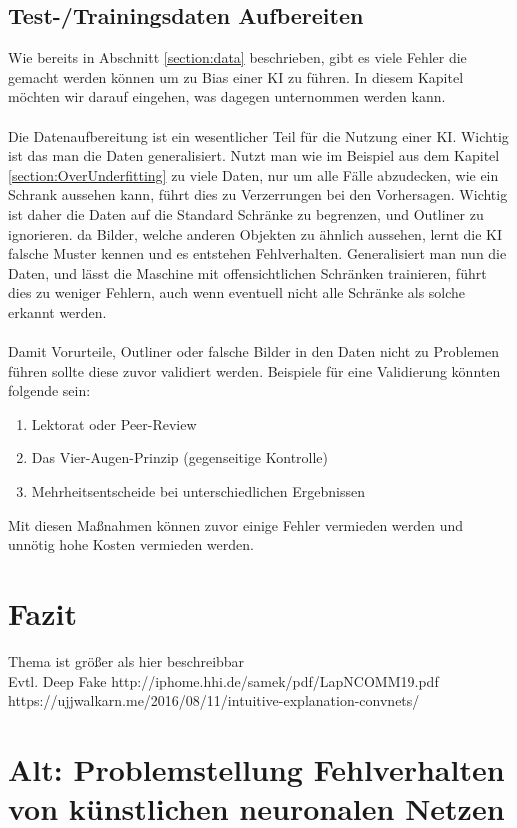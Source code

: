 \documentclass[12pt,oneside,a4paper,parskip]{scrbook}
\begin{document}
\section{Test-/Trainingsdaten Aufbereiten}
\label{section:preventData}
Wie bereits in Abschnitt \ref{section:data} beschrieben, gibt es viele Fehler die gemacht werden können um zu Bias einer KI zu führen. In diesem Kapitel möchten wir darauf eingehen, was dagegen unternommen werden kann.
\\\\
Die Datenaufbereitung ist ein wesentlicher Teil für die Nutzung einer KI.
Wichtig ist das man die Daten generalisiert. Nutzt man wie im Beispiel aus dem Kapitel \ref{section:OverUnderfitting} zu viele Daten, nur um alle Fälle abzudecken, wie ein Schrank aussehen kann, führt dies zu Verzerrungen bei den Vorhersagen. Wichtig ist daher die Daten auf die Standard Schränke zu begrenzen, und Outliner zu ignorieren. da Bilder, welche anderen Objekten zu ähnlich aussehen, lernt die KI falsche Muster kennen und es entstehen Fehlverhalten. Generalisiert man nun die Daten, und lässt die Maschine mit offensichtlichen Schränken trainieren, führt dies zu weniger Fehlern, auch wenn eventuell nicht alle Schränke als solche erkannt werden.
\\\\
Damit Vorurteile, Outliner oder falsche Bilder in den Daten nicht zu Problemen führen sollte diese zuvor validiert werden. Beispiele für eine Validierung könnten folgende sein:
\begin{enumerate}
	\item Lektorat oder Peer-Review
	\item Das Vier-Augen-Prinzip (gegenseitige Kontrolle)
	\item Mehrheitsentscheide bei unterschiedlichen Ergebnissen
\end{enumerate}

Mit diesen Maßnahmen können zuvor einige Fehler vermieden werden und unnötig hohe Kosten vermieden werden.

\chapter{Fazit}
Thema ist größer als hier beschreibbar
\\Evtl. Deep Fake
http://iphome.hhi.de/samek/pdf/LapNCOMM19.pdf
https://ujjwalkarn.me/2016/08/11/intuitive-explanation-convnets/


\chapter{Alt: Problemstellung Fehlverhalten von künstlichen neuronalen Netzen}
\end{document}
